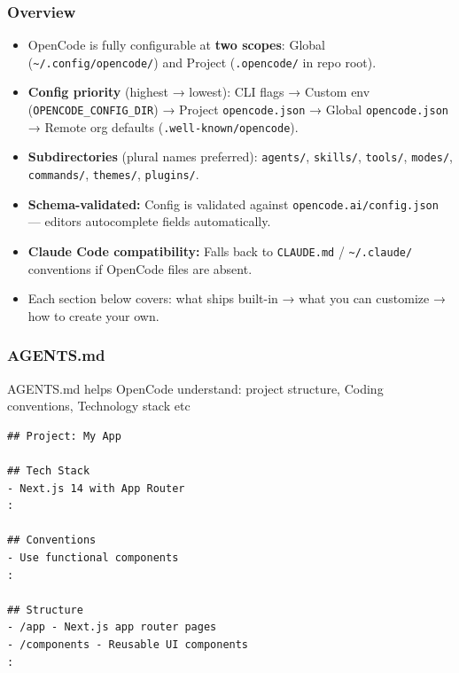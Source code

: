 \begin{frame}[fragile]\frametitle{Overview}
  \begin{itemize}
    \item OpenCode is fully configurable at \textbf{two scopes}: Global (\texttt{\textasciitilde/.config/opencode/}) and Project (\texttt{.opencode/} in repo root).
    \item \textbf{Config priority} (highest → lowest): CLI flags → Custom env (\texttt{OPENCODE\_CONFIG\_DIR}) → Project \texttt{opencode.json} → Global \texttt{opencode.json} → Remote org defaults (\texttt{.well-known/opencode}).
    \item \textbf{Subdirectories} (plural names preferred): \texttt{agents/}, \texttt{skills/}, \texttt{tools/}, \texttt{modes/}, \texttt{commands/}, \texttt{themes/}, \texttt{plugins/}.
    \item \textbf{Schema-validated:} Config is validated against \texttt{opencode.ai/config.json} — editors autocomplete fields automatically.
    \item \textbf{Claude Code compatibility:} Falls back to \texttt{CLAUDE.md} / \texttt{\textasciitilde/.claude/} conventions if OpenCode files are absent.
    \item Each section below covers: what ships built-in → what you can customize → how to create your own.
  \end{itemize}
\end{frame}

\begin{frame}[fragile]\frametitle{AGENTS.md}
AGENTS.md helps OpenCode understand: project structure, Coding conventions, Technology stack etc

\begin{lstlisting}
## Project: My App

## Tech Stack
- Next.js 14 with App Router
:

## Conventions
- Use functional components
:

## Structure
- /app - Next.js app router pages
- /components - Reusable UI components
:
\end{lstlisting}
\end{frame}

